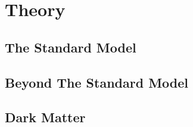 \chapter{Theory}
\section{The Standard Model}
\section{Beyond The Standard Model}
\section{Dark Matter}
